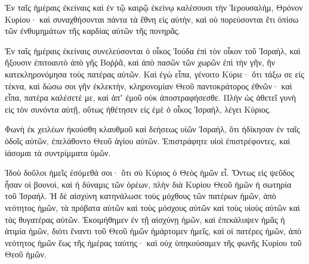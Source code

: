 {Ἐν ταῖς ἡμέραις ἐκείναις καὶ ἐν τῷ καιρῷ ἐκείνῳ καλέσουσι τὴν Ἱερουσαλὴμ, Θρόνον Κυρίου· καὶ συναχθήσονται πάντα τὰ ἔθνη εἰς αὐτὴν, καὶ οὐ πορεύσονται ἔτι ὀπίσω τῶν ἐνθυμημάτων τῆς καρδίας αὐτῶν τῆς πονηρᾶς.
\par }{\PP {}Ἐν ταῖς ἡμέραις ἐκείναις συνελεύσονται ὁ οἶκος Ἰούδα ἐπὶ τὸν οἶκον τοῦ Ἰσραὴλ, καὶ ἥξουσιν ἐπιτοαυτὸ ἀπὸ γῆς Βοῤῥᾶ, καὶ ἀπὸ πασῶν τῶν χωρῶν ἐπὶ τὴν γῆν, ἣν κατεκληρονόμησα τοὺς πατέρας αὐτῶν.
Καὶ ἐγὼ εἶπα, γένοιτο Κύριε· ὅτι τάξω σε εἰς τέκνα, καὶ δώσω σοι γῆν ἐκλεκτὴν, κληρονομίαν Θεοῦ παντοκράτορος ἐθνῶν· καὶ εἶπα, πατέρα καλέσετέ με, καὶ ἀπʼ ἐμοῦ οὐκ ἀποστραφήσεσθε.
Πλὴν ὡς ἀθετεῖ γυνὴ εἰς τὸν συνόντα αὐτῇ, οὕτως ἠθέτησεν εἰς ἐμὲ ὁ οἶκος Ἰσραὴλ, λέγει Κύριος.
\par }{\PP {}Φωνὴ ἐκ χειλέων ἠκούσθη κλαυθμοῦ καὶ δεήσεως υἱῶν Ἰσραὴλ, ὅτι ἠδίκησαν ἐν ταῖς ὁδοῖς αὐτῶν, ἐπελάθοντο Θεοῦ ἁγίου αὐτῶν.
Ἐπιστράφητε υἱοὶ ἐπιστρέφοντες, καὶ ἰάσομαι τὰ συντρίμματα ὑμῶν.
\par }{\PP Ἰδοὺ δοῦλοι ἡμεῖς ἐσόμεθά σοι· ὅτι σὺ Κύριος ὁ Θεὸς ἡμῶν εἶ.
Ὄντως εἰς ψεῦδος ἦσαν οἱ βουνοὶ, καὶ ἡ δύναμις τῶν ὀρέων, πλὴν διὰ Κυρίου Θεοῦ ἡμῶν ἡ σωτηρία τοῦ Ἰσραήλ.
Ἡ δὲ αἰσχύνη κατηνάλωσε τοὺς μόχθους τῶν πατέρων ἡμῶν, ἀπὸ νεότητος ἡμῶν, τὰ πρόβατα αὐτῶν καὶ τοὺς μόσχους αὐτῶν καὶ τοὺς υἱοὺς αὐτῶν καὶ τὰς θυγατέρας αὐτῶν.
Ἐκοιμήθημεν ἐν τῇ αἰσχύνῃ ἡμῶν, καὶ ἐπεκάλυψεν ἡμᾶς ἡ ἀτιμία ἡμῶν, διότι ἔναντι τοῦ Θεοῦ ἡμῶν ἡμάρτομεν ἡμεῖς, καὶ οἱ πατέρες ἡμῶν, ἀπὸ νεότητος ἡμῶν ἕως τῆς ἡμέρας ταύτης· καὶ οὐχ ὑπηκούσαμεν τῆς φωνῆς Κυρίου τοῦ Θεοῦ ἡμῶν.

}
